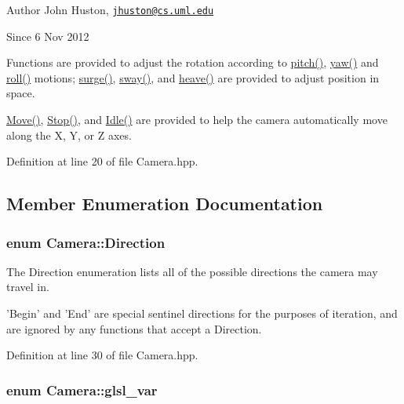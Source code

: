 \begin{DoxyAuthor}{\-Author}
\-John \-Huston, \href{mailto:jhuston@cs.uml.edu}{\tt jhuston@cs.\-uml.\-edu} 
\end{DoxyAuthor}
\begin{DoxySince}{\-Since}
6 \-Nov 2012
\end{DoxySince}
\-Functions are provided to adjust the rotation according to \hyperlink{class_camera_ade9b499340749c916d6ffeeadd7296d4}{pitch()}, \hyperlink{class_camera_aea440eca8100cae6ffcc6ca915733795}{yaw()} and \hyperlink{class_camera_a6a0a10b821c733f380cc82aff09d9498}{roll()} motions; \hyperlink{class_camera_abb2251df65445bf8efd3fe0074fb5033}{surge()}, \hyperlink{class_camera_abbe6fe82ed05e64e35b0c4ed2001b34e}{sway()}, and \hyperlink{class_camera_a2148d751f104d8e39c9832e2372df2d9}{heave()} are provided to adjust position in space.

\hyperlink{class_camera_a421e03f93824e178d6e77ff547cd290e}{\-Move()}, \hyperlink{class_camera_adf064f765f610684e0675bd67de013fd}{\-Stop()}, and \hyperlink{class_camera_aec3559fe43597656629fdb00157d3c73}{\-Idle()} are provided to help the camera automatically move along the \-X, \-Y, or \-Z axes. 

\-Definition at line 20 of file \-Camera.\-hpp.



\subsection{\-Member \-Enumeration \-Documentation}
\hypertarget{class_camera_a80cb65605322d27ad3b6d973484509ec}{
\subsubsection[{\-Direction}]{\setlength{\rightskip}{0pt plus 5cm}enum {\bf \-Camera\-::\-Direction}}}\label{class_camera_a80cb65605322d27ad3b6d973484509ec}


\-The \-Direction enumeration lists all of the possible directions the camera may travel in. 

'\-Begin' and '\-End' are special sentinel directions for the purposes of iteration, and are ignored by any functions that accept a \-Direction. 

\-Definition at line 30 of file \-Camera.\-hpp.

\hypertarget{class_camera_a6ff726a75a430e4f17e5dec42e4d4405}{
\subsubsection[{glsl\-\_\-var}]{\setlength{\rightskip}{0pt plus 5cm}enum {\bf \-Camera\-::glsl\-\_\-var}}}\label{class_camera_a6ff726a75a430e4f17e5dec42e4d4405}


